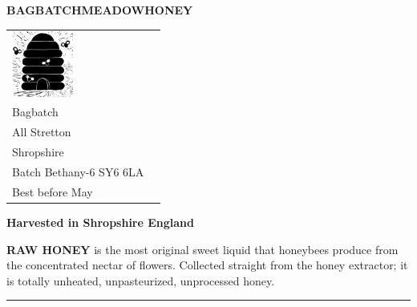 \documentclass[10pt, a4paper]{letter}
\begin{document}

\newcommand\honeylabel{%
{\fontsize{15.5pt}{20pt}\selectfont  \textbf{BAGBATCH\hfil MEADOW\hfil HONEY}} 
  \begin{tabular}{ll}%
    \begin{minipage}{2cm}%
      \includegraphics[width=2cm]{meadow-honey-skep-lino-cut.jpg}
    \end{minipage}%
    &
    \begin{minipage}{4.5cm}
     \par
      454g 1lb \hfill \ECFAugie Joe Collins\\
      \footnotesize\strut\hfill Bagbatch\\
      \strut\hfill All Stretton\\
      \strut\hfill  Shropshire\\
      Batch Bethany-6 \hfill SY6 6LA\\
      \AdvanceDate[1460]%
      Best before May \the\year{} \hfill\strut 
    \end{minipage}
  \end{tabular}
{\fontsize{14pt}{20pt}\selectfont  \textbf{Harvested in Shropshire England}}
}%

\begin{labels}
%
{%
  \honeylabel
  
}%
\end{labels}

\LeftLabelBorder=5mm%
\RightLabelBorder=5mm%
\TopLabelBorder=5mm%
\BottomLabelBorder=5mm%
\LabelSetup%
\newcommand\rawlabel{%
  \small
  {\bf RAW HONEY} is the most original sweet liquid that honeybees produce from the concentrated nectar of flowers. 
   Collected straight from the honey extractor; it is totally unheated, unpasteurized, unprocessed honey.\vfill
}%

\begin{labels}
%
{%
  \rawlabel
  
}%
\end{labels}


\LeftPageMargin=0mm
\LabelSetup
\setlength{\parskip}{1em}
%
{%
  \rule{\paperwidth}{3pt}\par\par
}%
\end{document}
